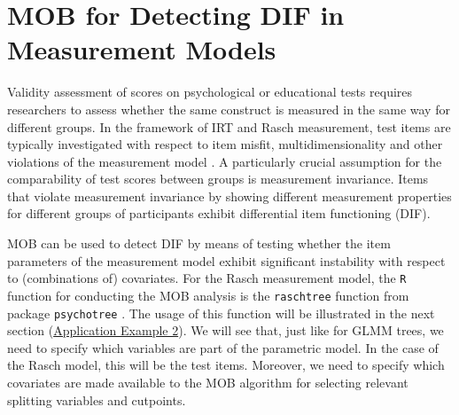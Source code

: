 \documentclass[doc,floatsintext,natbib]{apa7}
\newcommand{\edc}[1]{\textcolor{blue}{#1}}
\begin{document}








\section{MOB for Detecting DIF in Measurement Models}
\label{sec:raschtree}

Validity assessment of scores on psychological or educational tests requires researchers to assess whether the same construct is measured in the same way for different groups. In the framework of IRT and Rasch measurement, test items are typically investigated with respect to item misfit, multidimensionality and other violations of the measurement model \citep[cf., for example][for an introduction]{DebStrZei:2022:CRC}. A particularly crucial assumption for the comparability of test scores between groups is measurement invariance. Items that violate measurement invariance by showing different measurement properties for different groups of participants exhibit differential item functioning (DIF).

MOB can be used to detect DIF by means of testing whether the item parameters of the measurement model exhibit significant instability with respect to (combinations of) covariates. For the Rasch measurement model, the \texttt{R} function for conducting the MOB analysis is the \texttt{raschtree} function from package \texttt{psychotree} \citep{StroyKopf15}. The usage of this function will be illustrated in the next section (\hyperref[sec:TutorialRasch]{Application Example 2}). We will see that, just like for GLMM trees, we need to specify which variables are part of the parametric model. In the case of the Rasch model, this will be the test items. Moreover, we need to specify which covariates are made available to the MOB algorithm for selecting relevant splitting variables and cutpoints. 
\end{document}
